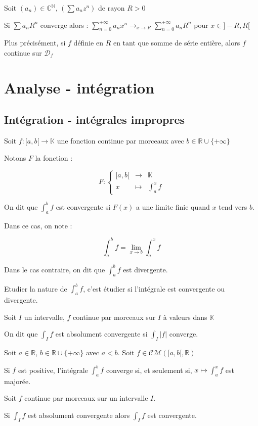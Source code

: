 \documentclass[a4paper,12pt]{book}
\newcommand{\Def}[2]{\begin{tcolorbox}[colback=white,colframe=red!10!green!20!blue!75!, title=Définition : #1]#2\end{tcolorbox}}
\newcommand{\Thr}[2]{\begin{tcolorbox}[sharp corners, colback=white,colframe=red!10!blue!30!green!75!, title=Théorème : #1]#2\end{tcolorbox}}
\def\R{\mathbb{R}}
\def\C{\mathbb{C}}
\def\N{\mathbb{N}}
\def\K{\mathbb{K}}
\begin{document}
\Thr{Convergence radiale}{Soit $(a_n)\in\C^\N$, $(\sum a_nz^n)$ de rayon $R>0$ \par Si $\sum a_nR^n$ converge alors : $\sum\limits_{n=0}^{+\infty}a_nx^n\to_{x\to R}\sum\limits_{n=0}^{+\infty}a_nR^n$ pour $x\in]-R,R[$
\par Plus précisément, si $f$ définie en $R$ en tant que somme de série entière, alors $f$ continue sur $\mathcal{D}_f$}


\section{Analyse - intégration}
\subsection{Intégration - intégrales impropres}
\Def{}{Soit $f:[a,b[\to\K$ une fonction continue par morceaux avec $b\in\R\cup\{+\infty\}$
\par Notons $F$ la fonction :
\par $$F :\left\{\begin{array}{rcl}[a,b[ & \to & \K \\ x & \mapsto & \int_a^x f\end{array}\right.$$
\par On dit que $\int_a^bf$ est convergente si $F(x)$ a une limite finie quand $x$ tend vers $b$.
\par Dans ce cas, on note :
\par $$\int_a^bf=\lim\limits_{x\to b}\int_a^xf$$
\par Dans le cas contraire, on dit que $\int_a^bf$ est divergente.
\par Etudier la nature de $\int_a^bf$, c'est étudier si l'intégrale est convergente ou divergente.}
\Def{}{Soit $I$ un intervalle, $f$ continue par morceaux sur $I$ à valeurs dans $\K$ \par On dit que $\int_If$ est absolument convergente si $\int_I\vert f\vert$ converge.}

\Thr{}{Soit $a\in \R$, $b\in\R\cup\{+\infty\}$ avec $a<b$. Soit $f\in\mathcal{CM}([a,b[, \R)$
\par Si $f$ est positive, l'intégrale $\int_a^bf$ converge si, et seulement si, $x\mapsto\int_a^xf$ est majorée.}
\Thr{}{Soit $f$ continue par morceaux sur un intervalle $I$.
\par Si $\int_If$ est absolument convergente alors $\int_If$ est convergente.}
\end{document}
